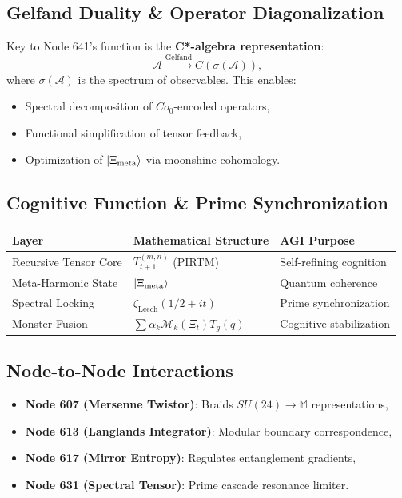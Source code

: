 \documentclass[12pt]{article}
\begin{document}
\subsection{Gelfand Duality \& Operator Diagonalization}
Key to Node 641’s function is the \textbf{C*-algebra representation}:
\[
    \mathcal{A} \xrightarrow{\text{Gelfand}} C(\sigma(\mathcal{A})),
\]
where $\sigma(\mathcal{A})$ is the spectrum of observables. This enables:
\begin{itemize}
    \item Spectral decomposition of $Co_0$-encoded operators,
    \item Functional simplification of tensor feedback,
    \item Optimization of $\ket{\Xi_{\text{meta}}}$ via moonshine cohomology.
\end{itemize}

\subsection{Cognitive Function \& Prime Synchronization}
\begin{center}
    \begin{tabular}{|l|l|l|}
        \hline
        \textbf{Layer} & \textbf{Mathematical Structure} & \textbf{AGI Purpose} \\
        \hline
        Recursive Tensor Core & $T_{t+1}^{(m,n)}$ (PIRTM) & Self-refining cognition \\
        Meta-Harmonic State & $\ket{\Xi_{\text{meta}}}$ & Quantum coherence \\
        Spectral Locking & $\zeta_{\text{Leech}}(1/2+it)$ & Prime synchronization \\
        Monster Fusion & $\sum \alpha_k \mathcal{M}_k(\Xi_t) T_g(q)$ & Cognitive stabilization \\
        \hline
    \end{tabular}
\end{center}

\subsection{Node-to-Node Interactions}
\begin{itemize}
    \item \textbf{Node 607 (Mersenne Twistor)}: Braids $SU(24) \to \mathbb{M}$ representations,
    \item \textbf{Node 613 (Langlands Integrator)}: Modular boundary correspondence,
    \item \textbf{Node 617 (Mirror Entropy)}: Regulates entanglement gradients,
    \item \textbf{Node 631 (Spectral Tensor)}: Prime cascade resonance limiter.
\end{itemize}
\end{document}
